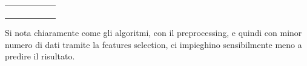 \begin{table}[ht]
\begin{tabular}{@{}lcccll@{}}
\multicolumn{1}{|l|}{}                                            & \multicolumn{1}{c|}{}                                       & \multicolumn{4}{c|}{}                                                 \\
\multicolumn{1}{|l|}{}                                            & \multicolumn{1}{c|}{}                                       & \multicolumn{4}{c|}{}                                                 \\ \cmidrule(l){2-6} 
\multicolumn{1}{|l|}{}                                            & \multicolumn{5}{r|}{}                                                                                                               \\ \midrule
                                                                  & \multicolumn{1}{l}{}                                        &  & \multicolumn{1}{r}{} &                      &                      \\ \bottomrule
\end{tabular}
\end{table}
\newline Si nota chiaramente come gli algoritmi, con il preprocessing, e quindi con minor numero di dati tramite la features selection, ci impieghino sensibilmente meno a predire il risultato. 

